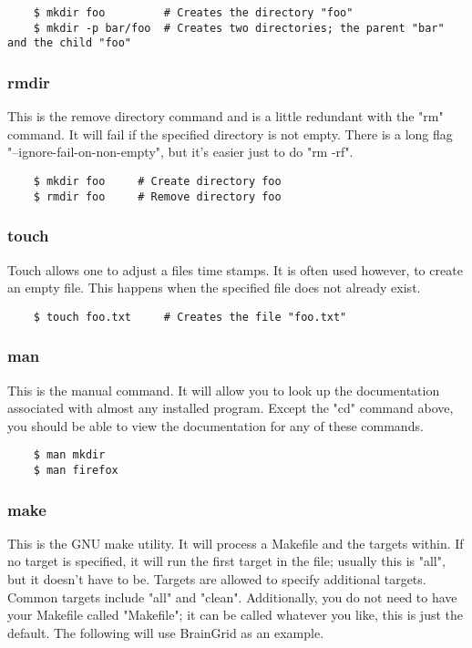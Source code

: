 	\begin{lstlisting}
	$ mkdir foo			# Creates the directory "foo"
	$ mkdir -p bar/foo	# Creates two directories; the parent "bar" and the child "foo"
	\end{lstlisting}


\subsubsection{rmdir} \mdseries
This is the remove directory command and is a little redundant with the "rm" command.  It will fail if the specified directory is not empty.  There is a long flag "--ignore-fail-on-non-empty", but it's easier just to do "rm -rf".

	\begin{lstlisting}
	$ mkdir foo		# Create directory foo
	$ rmdir foo		# Remove directory foo
	\end{lstlisting}

\subsubsection{touch} \mdseries
Touch allows one to adjust a files time stamps.  It is often used however, to create an empty file.  This happens when the specified file does not already exist.

	\begin{lstlisting}
	$ touch foo.txt		# Creates the file "foo.txt"
	\end{lstlisting}

\subsubsection{man} \mdseries
This is the manual command.  It will allow you to look up the documentation associated with almost any installed program.  Except the "cd" command above, you should be able to view the documentation for any of these commands.

	\begin{lstlisting}
	$ man mkdir
	$ man firefox
	\end{lstlisting}

\subsubsection{make} \mdseries
This is the GNU make utility.  It will process a Makefile and the targets within.  If no target is specified, it will run the first target in the file; usually this is "all", but it doesn't have to be.  Targets are allowed to specify additional targets.  Common targets include "all" and "clean".  Additionally, you do not need to have your Makefile called "Makefile"; it can be called whatever you like, this is just the default.  The following will use BrainGrid as an example.  

